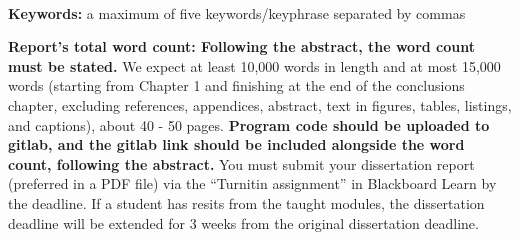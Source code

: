 ~\\[1cm]
\noindent %
\textbf{Keywords:} a maximum of five keywords/keyphrase separated by commas

\vfill
\noindent
\textbf{Report's total word count: Following the abstract, the word count must be stated.} We expect at least 10,000 words in length and at most 15,000 words (starting from Chapter 1 and finishing at the end of the conclusions chapter, excluding references, appendices, abstract, text in figures, tables, listings, and captions), about 40 - 50 pages. \newline
\newline
\noindent
\textbf{Program code should be uploaded to gitlab, and the gitlab link should be included alongside the word count, following the abstract.} \newline
\newline
You must submit your dissertation report (preferred in a PDF file) via the “Turnitin assignment” in Blackboard Learn by the deadline. If a student has resits from the taught modules, the dissertation deadline will be extended for 3 weeks from the original dissertation deadline.

